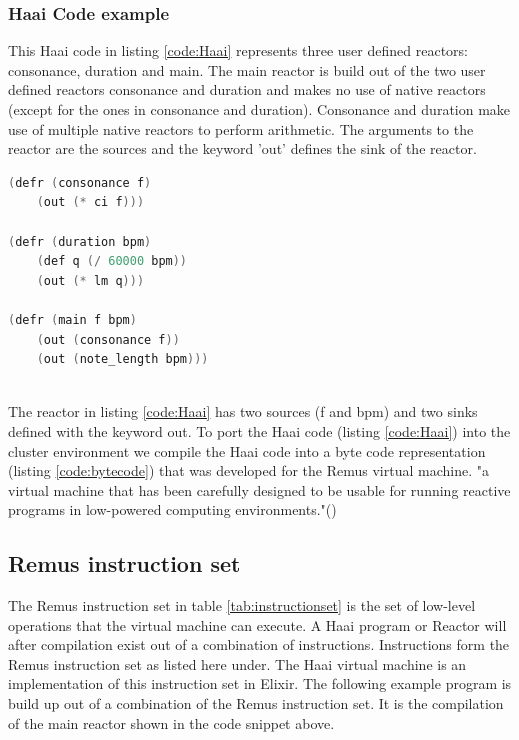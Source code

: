 \documentclass[a4paper]{book}
\begin{document}
\subsubsection*{Haai Code example}
This Haai code in listing \ref{code:Haai} represents three user defined reactors: consonance, duration and main. The main reactor is build out of the two user defined reactors consonance and duration and makes no use of native reactors (except for the ones in consonance and duration). Consonance and duration make use of multiple native reactors to perform arithmetic. The arguments to the reactor are the sources and the keyword 'out' defines the sink of the reactor.

\begin{lstlisting}[language=C, caption={Haai code}, captionpos=b,label={code:Haai}, basicstyle=\ttfamily, frame=single]
(defr (consonance f)
	(out (* ci f)))

(defr (duration bpm)
	(def q (/ 60000 bpm))
	(out (* lm q)))

(defr (main f bpm)
	(out (consonance f))
	(out (note_length bpm)))
	
\end{lstlisting}
The reactor in listing \ref{code:Haai} has two sources (f and bpm) and two sinks defined with the keyword out. To port the Haai code (listing \ref{code:Haai}) into the cluster environment we compile the Haai code into a byte code representation (listing \ref{code:bytecode}) that was developed for the Remus virtual machine. "a virtual machine that has been carefully designed to be usable for running reactive programs in low-powered computing environments."(\cite{oeyen_remus_2022})


\subsection*{Remus instruction set}
The Remus instruction set in table \ref{tab:instructionset} is the set of low-level operations that the virtual machine can execute. A Haai program or Reactor will after compilation exist out of a combination of instructions. Instructions form the Remus instruction set as listed here under. The Haai virtual machine is an implementation of this instruction set in Elixir. The following example program is build up out of a combination of the Remus instruction set. It is the compilation of the main reactor shown in the code snippet above. 
\end{document}
